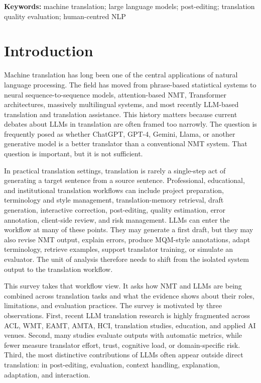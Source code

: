 \documentclass[11pt]{article}
\begin{document}
\noindent\textbf{Keywords:} machine translation; large language models; post-editing; translation quality evaluation; human-centred NLP

\section{Introduction}
Machine translation has long been one of the central applications of natural language processing. The field has moved from phrase-based statistical systems to neural sequence-to-sequence models, attention-based NMT, Transformer architectures, massively multilingual systems, and most recently LLM-based translation and translation assistance. This history matters because current debates about LLMs in translation are often framed too narrowly. The question is frequently posed as whether ChatGPT, GPT-4, Gemini, Llama, or another generative model is a better translator than a conventional NMT system. That question is important, but it is not sufficient.

In practical translation settings, translation is rarely a single-step act of generating a target sentence from a source sentence. Professional, educational, and institutional translation workflows can include project preparation, terminology and style management, translation-memory retrieval, draft generation, interactive correction, post-editing, quality estimation, error annotation, client-side review, and risk management. LLMs can enter the workflow at many of these points. They may generate a first draft, but they may also revise NMT output, explain errors, produce MQM-style annotations, adapt terminology, retrieve examples, support translator training, or simulate an evaluator. The unit of analysis therefore needs to shift from the isolated system output to the translation workflow.

This survey takes that workflow view. It asks how NMT and LLMs are being combined across translation tasks and what the evidence shows about their roles, limitations, and evaluation practices. The survey is motivated by three observations. First, recent LLM translation research is highly fragmented across ACL, WMT, EAMT, AMTA, HCI, translation studies, education, and applied AI venues. Second, many studies evaluate outputs with automatic metrics, while fewer measure translator effort, trust, cognitive load, or domain-specific risk. Third, the most distinctive contributions of LLMs often appear outside direct translation: in post-editing, evaluation, context handling, explanation, adaptation, and interaction.
\end{document}
